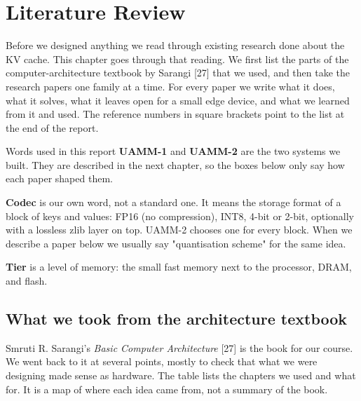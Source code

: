 \documentclass[12pt,a4paper]{report}
\begin{document}
\chapter{Literature Review}\label{sec:2}
Before we designed anything we read through existing research done about the KV cache. This chapter goes through that reading. We first list the parts of the computer-architecture textbook by Sarangi [27] that we used, and then take the research papers one family at a time. For every paper we write what it does, what it solves, what it leaves open for a small edge device, and what we learned from it and used. The reference numbers in square brackets point to the list at the end of the report.

\begin{calloutbox}{Words used in this report}
\textbf{UAMM-1} and \textbf{UAMM-2} are the two systems we built. They are described in the next chapter, so the boxes below only say how each paper shaped them.

\textbf{Codec} is our own word, not a standard one. It means the storage format of a block of keys and values: FP16 (no compression), INT8, 4-bit or 2-bit, optionally with a lossless zlib layer on top. UAMM-2 chooses one for every block. When we describe a paper below we usually say "quantisation scheme" for the same idea.

\textbf{Tier} is a level of memory: the small fast memory next to the processor, DRAM, and flash.

\end{calloutbox}
\section{What we took from the architecture textbook}\label{sec:2_0}
Smruti R. Sarangi's \textit{Basic Computer Architecture} [27] is the book for our course. We went back to it at several points, mostly to check that what we were designing made sense as hardware. The table lists the chapters we used and what for. It is a map of where each idea came from, not a summary of the book.
\end{document}
